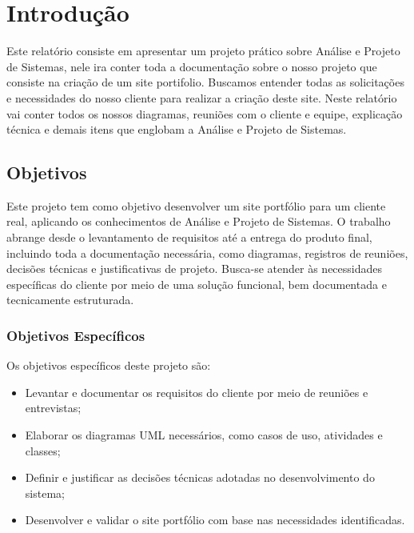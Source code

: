 \chapter{Introdução}
\label{chap:intro}


Este relatório consiste em apresentar um projeto prático sobre Análise e Projeto de Sistemas, nele ira conter toda a documentação sobre o nosso projeto que consiste na criação de um site portifolio. Buscamos entender todas as solicitações e necessidades do nosso cliente para realizar a criação deste site. Neste relatório vai conter todos os nossos diagramas, reuniões com o cliente e equipe, explicação técnica e demais itens que englobam a Análise e Projeto de Sistemas.




% 
\section{Objetivos}
\label{sec:obj}
Este projeto tem como objetivo desenvolver um site portfólio para um cliente real, aplicando os conhecimentos de Análise e Projeto de Sistemas. O trabalho abrange desde o levantamento de requisitos até a entrega do produto final, incluindo toda a documentação necessária, como diagramas, registros de reuniões, decisões técnicas e justificativas de projeto. Busca-se atender às necessidades específicas do cliente por meio de uma solução funcional, bem documentada e tecnicamente estruturada. 
\label{sec:obj}

\subsection{Objetivos Específicos}
\label{ssec:objesp}
Os objetivos específicos deste projeto são:
\begin{itemize}
      \item Levantar e documentar os requisitos do cliente por meio de reuniões e entrevistas;
      \item Elaborar os diagramas UML necessários, como casos de uso, atividades e classes;
      \item Definir e justificar as decisões técnicas adotadas no desenvolvimento do sistema;
      \item Desenvolver e validar o site portfólio com base nas necessidades identificadas.
  \end{itemize}

